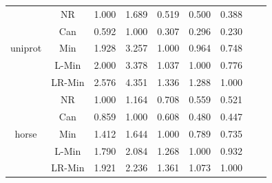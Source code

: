 \documentclass[11pt]{book}
\begin{document}
\begin{table}
\begin{tabular}{|c|c|c|c|c|c|c|c|c|}
    \hline
    \multirow{5}{*}{uniprot}
         & NR & 1.000 & 1.689 & 0.519 & 0.500 & 0.388 \\                                                                                                                                                             
         & Can & 0.592 & 1.000 & 0.307 & 0.296 & 0.230 \\                                                                                                                                                            
         & Min & 1.928 & 3.257 & 1.000 & 0.964 & 0.748 \\                                                                                                                                                            
         & L-Min & 2.000 & 3.378 & 1.037 & 1.000 & 0.776 \\                                                                                                                                                          
         & LR-Min & 2.576 & 4.351 & 1.336 & 1.288 & 1.000 \\
    
    \hline
    \multirow{5}{*}{horse}
         & NR & 1.000 & 1.164 & 0.708 & 0.559 & 0.521 \\                                                                                                                                                             
         & Can & 0.859 & 1.000 & 0.608 & 0.480 & 0.447 \\                                                                                                                                                            
         & Min & 1.412 & 1.644 & 1.000 & 0.789 & 0.735 \\                                                                                                                                                            
         & L-Min & 1.790 & 2.084 & 1.268 & 1.000 & 0.932 \\                                                                                                                                                          
         & LR-Min & 1.921 & 2.236 & 1.361 & 1.073 & 1.000 \\  
    

\end{tabular}
\end{table}
\end{document}
